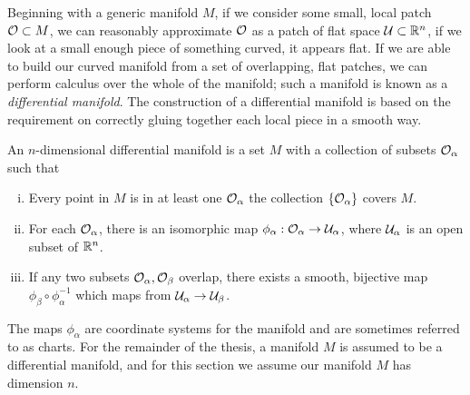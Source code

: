 Beginning with a generic manifold $M$, if we consider some small, local patch ${\cal O} \subset M$, we can reasonably approximate ${\cal O}$ as a patch of flat space $\mathcal{U} \subset {\mathbb{R}}^n$, \ie if we look at a small enough piece of something curved, it appears flat. If we are able to build our curved manifold from a set of overlapping, flat patches, we can perform calculus over the whole of the manifold; such a manifold is known as a \emph{differential manifold}. The construction of a differential manifold is based on the requirement on correctly gluing together each local piece in a smooth way. 
\begin{defn}
An $n$-dimensional differential manifold is a set $M$ with a collection of subsets ${\cal O}_\alpha$ such that 
\begin{enumerate}[(i)]
	\item Every point in $M$ is in at least one ${\cal O}_\alpha$ \ie the collection $\{{\cal O}_\alpha \}$ covers $M$.
	\item For each ${\cal O}_\alpha$, there is an isomorphic map $ \phi_\alpha: {\cal O}_\alpha \rightarrow {\cal U}_\alpha$, where ${\cal U}_\alpha$ is an open subset of ${\mathbb{R}}^n$. 
	\item If any two subsets ${\cal O}_\alpha, {\cal O}_\beta$ overlap, there exists a smooth, bijective map $\phi_\beta \circ \phi_\alpha^{-1}$ which maps from ${\cal U}_\alpha \rightarrow {\cal U}_\beta$. 
\end{enumerate}
\end{defn}
The maps $\phi_\alpha$ are coordinate systems for the manifold and are sometimes referred to as charts. For the remainder of the thesis, a manifold $M$ is assumed to be a differential manifold, and for this section we assume our manifold $M$ has dimension $n$.


